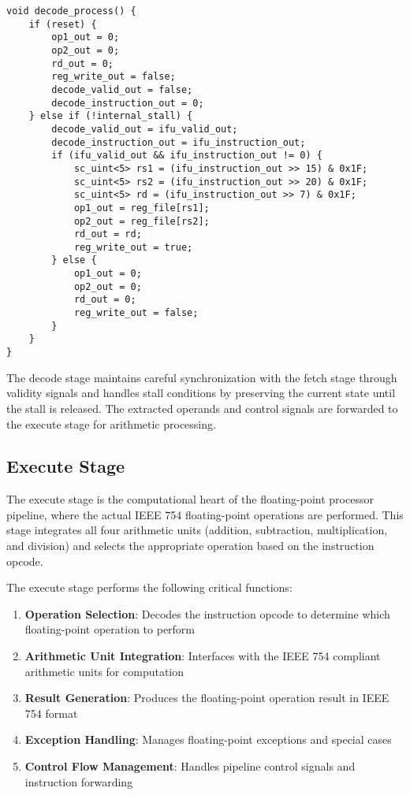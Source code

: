 \begin{lstlisting}[caption={Decode Process}]
void decode_process() {
    if (reset) {
        op1_out = 0;
        op2_out = 0;
        rd_out = 0;
        reg_write_out = false;
        decode_valid_out = false;
        decode_instruction_out = 0;
    } else if (!internal_stall) {
        decode_valid_out = ifu_valid_out;
        decode_instruction_out = ifu_instruction_out;
        if (ifu_valid_out && ifu_instruction_out != 0) {
            sc_uint<5> rs1 = (ifu_instruction_out >> 15) & 0x1F;
            sc_uint<5> rs2 = (ifu_instruction_out >> 20) & 0x1F;
            sc_uint<5> rd = (ifu_instruction_out >> 7) & 0x1F;
            op1_out = reg_file[rs1];
            op2_out = reg_file[rs2];
            rd_out = rd;
            reg_write_out = true;
        } else {
            op1_out = 0;
            op2_out = 0;
            rd_out = 0;
            reg_write_out = false;
        }
    }
}
\end{lstlisting}

The decode stage maintains careful synchronization with the fetch stage through validity signals and handles stall conditions by preserving the current state until the stall is released. The extracted operands and control signals are forwarded to the execute stage for arithmetic processing.

\subsection{Execute Stage}
\label{subsec:execute_stage}

The execute stage is the computational heart of the floating-point processor pipeline, where the actual IEEE 754 floating-point operations are performed. This stage integrates all four arithmetic units (addition, subtraction, multiplication, and division) and selects the appropriate operation based on the instruction opcode.

The execute stage performs the following critical functions:
\begin{enumerate}
    \item \textbf{Operation Selection}: Decodes the instruction opcode to determine which floating-point operation to perform
    \item \textbf{Arithmetic Unit Integration}: Interfaces with the IEEE 754 compliant arithmetic units for computation
    \item \textbf{Result Generation}: Produces the floating-point operation result in IEEE 754 format
    \item \textbf{Exception Handling}: Manages floating-point exceptions and special cases
    \item \textbf{Control Flow Management}: Handles pipeline control signals and instruction forwarding
\end{enumerate}

